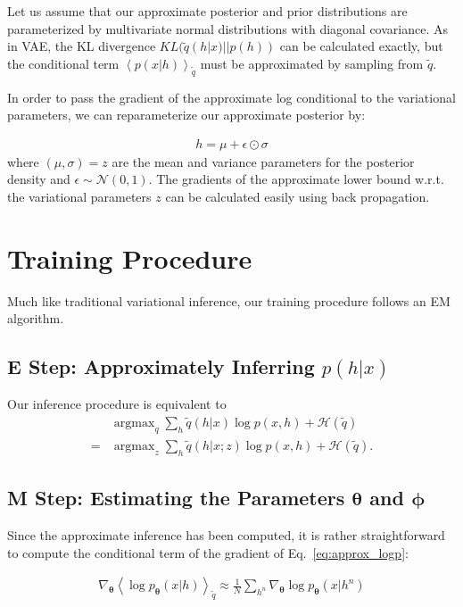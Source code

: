 \documentclass{article}
\newcommand{\qexp}[1]{\left<#1\right>}
\newcommand{\vects}[1]{\boldsymbol{#1}}
\newcommand{\TT}[0]{\vects{\theta}}
\newcommand{\PP}[0]{\vects{\phi}}
\newcommand{\HH}[0]{\mathcal{H}}
\newcommand{\NN}[0]{\mathcal{N}}
\DeclareMathOperator*{\argmax}{\arg \max}
\begin{document}
Let us assume that our approximate posterior and prior distributions are parameterized by multivariate normal distributions with diagonal covariance. As in VAE, the KL divergence $KL(\tilde{q}(h|x) || p(h))$ can be calculated exactly, but the conditional term $\qexp{p(x|h)}_{\tilde{q}}$ must be approximated by sampling from $\tilde{q}$. 

In order to pass the gradient of the approximate log conditional to the variational parameters, we can reparameterize our approximate posterior by:

\begin{align}
h = \mu + \epsilon \odot \sigma
\end{align}
where $(\mu, \sigma) = z$ are the mean and variance parameters for the posterior density and $\epsilon \sim \NN(0, 1)$. The gradients of the approximate lower bound w.r.t. the variational parameters $z$ can be calculated easily using back propagation.

\section{Training Procedure}
Much like traditional variational inference, our training procedure follows an EM algorithm.

\subsection{E Step: Approximately Inferring $p(h|x)$}
Our inference procedure is equivalent to 
\begin{align*}
    &\argmax_{q}  \sum_h \tilde{q}(h|x) \log p(x,h) + \HH(\tilde{q}) \\
    =& \argmax_{z} \sum_h \tilde{q}(h|x; z) \log p(x,h) + \HH(\tilde{q}).
\end{align*}

\subsection{M Step: Estimating the Parameters $\TT$ and $\PP$}

Since the approximate inference has been computed, it is rather straightforward
to compute the conditional term of the gradient of Eq.~\eqref{eq:approx_logp}:

\begin{align*}
    \nabla_{\TT} \qexp{\log p_{\TT}(x|h)}_{\tilde{q}} \approx \frac{1}{N} \sum_{h^n} \nabla_{\TT} \log p_{\TT}(x|h^n)
\end{align*}
\end{document}
